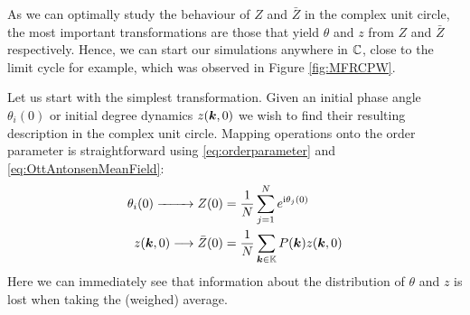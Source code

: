 
As we can optimally study the behaviour of $Z$ and $\bar{Z}$ in the complex unit circle, the most important transformations are those that yield $\theta$ and $z$ from $Z$ and $\bar{Z}$ respectively. Hence, we can start our simulations anywhere in ${\mathbb{C}}$, close to the limit cycle for example, which was observed in Figure \ref{fig:MFRCPW}.



Let us start with the simplest transformation. Given an initial phase angle $\theta_i(0)$ or initial degree dynamics $z({\boldsymbol{k}}, 0)$ we wish to find their resulting description in the complex unit circle. Mapping operations onto the order parameter is straightforward using \eqref{eq:orderparameter} and \eqref{eq:OttAntonsenMeanField}:
\begin{align}
\theta_i(0) \xrightarrow{\hspace*{8mm}} Z(0) &= \frac{1}{N} \sum_{j=1}^N e^{{\rm{i}}\theta_j(0)} \label{eq:thetatoZ}\\
z({\boldsymbol{k}},0) \longrightarrow \bar{Z}(0) &= \frac{1}{N} \sum_{{\boldsymbol{k}} \in {\mathbb{K}}} P({\boldsymbol{k}}) z({\boldsymbol{k}}, 0)  \label{eq:ztoZ}
\end{align}
Here we can immediately see that information about the distribution of $\theta$ and $z$ is lost when taking the (weighed) average. 


